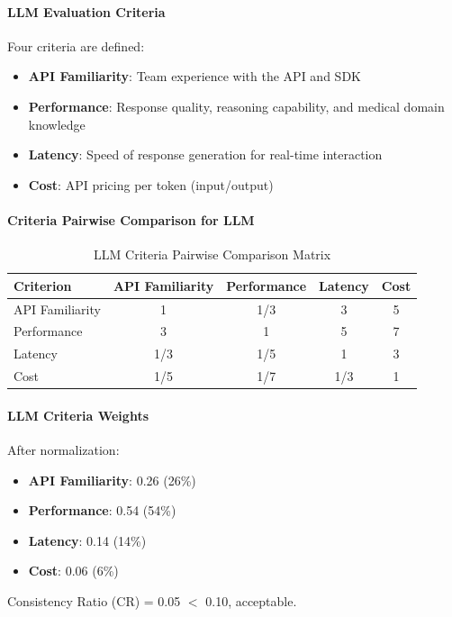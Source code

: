 \paragraph{LLM Evaluation Criteria}
Four criteria are defined:
\begin{itemize}
    \item \textbf{API Familiarity}: Team experience with the API and SDK
    \item \textbf{Performance}: Response quality, reasoning capability, and medical domain knowledge
    \item \textbf{Latency}: Speed of response generation for real-time interaction
    \item \textbf{Cost}: API pricing per token (input/output)
\end{itemize}

\paragraph{Criteria Pairwise Comparison for LLM}
\begin{table}[H]
\centering
\caption{LLM Criteria Pairwise Comparison Matrix}
\begin{tabular}{lcccc}
\toprule
\textbf{Criterion} & \textbf{API Familiarity} & \textbf{Performance} & \textbf{Latency} & \textbf{Cost} \\
\midrule
API Familiarity & 1 & 1/3 & 3 & 5 \\
Performance & 3 & 1 & 5 & 7 \\
Latency & 1/3 & 1/5 & 1 & 3 \\
Cost & 1/5 & 1/7 & 1/3 & 1 \\
\bottomrule
\end{tabular}
\end{table}

\paragraph{LLM Criteria Weights}
After normalization:
\begin{itemize}
    \item \textbf{API Familiarity}: 0.26 (26\%)
    \item \textbf{Performance}: 0.54 (54\%)
    \item \textbf{Latency}: 0.14 (14\%)
    \item \textbf{Cost}: 0.06 (6\%)
\end{itemize}

Consistency Ratio (CR) = 0.05 $<$ 0.10, acceptable.

